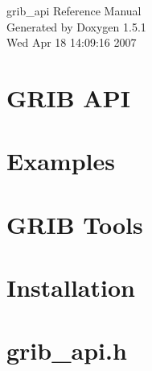 \documentclass[a4paper]{book}
\begin{document}
\begin{titlepage}
\vspace*{7cm}
\begin{center}
{\Large grib\_\-api Reference Manual}\\
\vspace*{1cm}
{\large Generated by Doxygen 1.5.1}\\
\vspace*{0.5cm}
{\small Wed Apr 18 14:09:16 2007}\\
\end{center}
\end{titlepage}
\clearemptydoublepage
{}
\tableofcontents
\clearemptydoublepage
{}
\chapter{GRIB API}
\label{index}\hypertarget{index}{}









\chapter{Examples}












\chapter{GRIB Tools}












\chapter{Installation}


\chapter{grib\_\-api.h}

\printindex
\end{document}
